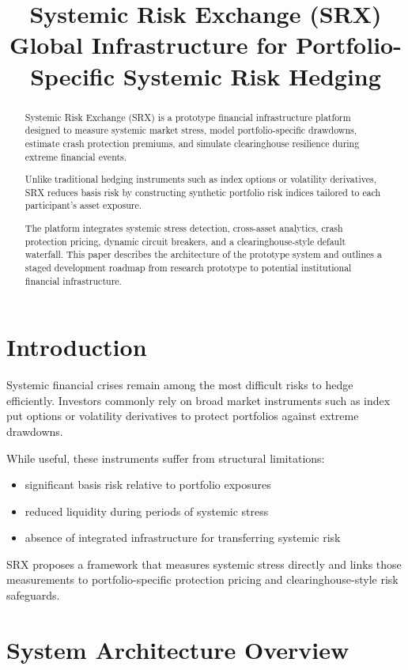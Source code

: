 \documentclass[11pt]{article}
\title{\textbf{Systemic Risk Exchange (SRX)}\\
Global Infrastructure for Portfolio-Specific Systemic Risk Hedging}
\author{}
\date{}
\begin{document}
\maketitle

\begin{abstract}
Systemic Risk Exchange (SRX) is a prototype financial infrastructure platform designed to measure systemic market stress, model portfolio-specific drawdowns, estimate crash protection premiums, and simulate clearinghouse resilience during extreme financial events.

Unlike traditional hedging instruments such as index options or volatility derivatives, SRX reduces basis risk by constructing synthetic portfolio risk indices tailored to each participant’s asset exposure.

The platform integrates systemic stress detection, cross-asset analytics, crash protection pricing, dynamic circuit breakers, and a clearinghouse-style default waterfall. This paper describes the architecture of the prototype system and outlines a staged development roadmap from research prototype to potential institutional financial infrastructure.
\end{abstract}

\section{Introduction}

Systemic financial crises remain among the most difficult risks to hedge efficiently. Investors commonly rely on broad market instruments such as index put options or volatility derivatives to protect portfolios against extreme drawdowns.

While useful, these instruments suffer from structural limitations:

\begin{itemize}
\item significant basis risk relative to portfolio exposures
\item reduced liquidity during periods of systemic stress
\item absence of integrated infrastructure for transferring systemic risk
\end{itemize}

SRX proposes a framework that measures systemic stress directly and links those measurements to portfolio-specific protection pricing and clearinghouse-style risk safeguards.

\section{System Architecture Overview}
\end{document}
